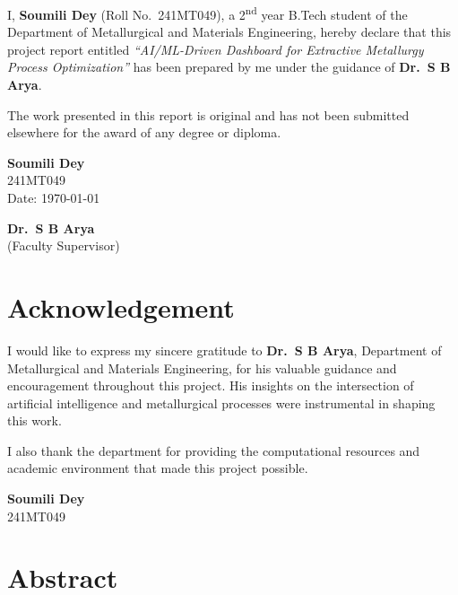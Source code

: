 \documentclass[12pt,a4paper]{report}
\begin{document}
I, \textbf{Soumili Dey} (Roll No.\ 241MT049), a 2\textsuperscript{nd} year B.Tech student of the Department of Metallurgical and Materials Engineering, hereby declare that this project report entitled \emph{``AI/ML-Driven Dashboard for Extractive Metallurgy Process Optimization''} has been prepared by me under the guidance of \textbf{Dr.\ S B Arya}.

The work presented in this report is original and has not been submitted elsewhere for the award of any degree or diploma.

\vspace{2cm}

\noindent
\begin{minipage}[t]{0.45\textwidth}
\textbf{Soumili Dey}\\
241MT049\\
Date: \today
\end{minipage}
\hfill
\begin{minipage}[t]{0.45\textwidth}
\begin{flushright}
\textbf{Dr.\ S B Arya}\\
(Faculty Supervisor)
\end{flushright}
\end{minipage}

\chapter*{Acknowledgement}

I would like to express my sincere gratitude to \textbf{Dr.\ S B Arya}, Department of Metallurgical and Materials Engineering, for his valuable guidance and encouragement throughout this project. His insights on the intersection of artificial intelligence and metallurgical processes were instrumental in shaping this work.

I also thank the department for providing the computational resources and academic environment that made this project possible.

\vspace{1cm}
\noindent
\textbf{Soumili Dey}\\
241MT049

\chapter*{Abstract}
\end{document}
